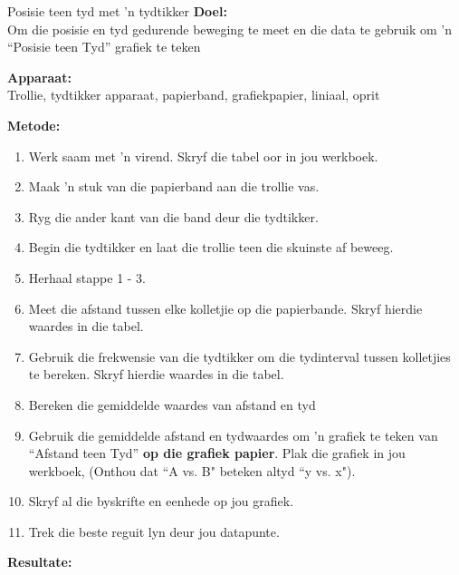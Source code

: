 \begin{f_experiment}{Posisie teen tyd met 'n tydtikker}
            \nopagebreak
\textbf{Doel:}\\
Om die posisie en tyd gedurende beweging te meet en die data te gebruik om 'n ``Posisie teen Tyd'' grafiek te teken \par

\textbf{Apparaat:}\\
Trollie, tydtikker apparaat, papierband, grafiekpapier, liniaal, oprit \par
\textbf{Metode:}
\begin{enumerate}[noitemsep, label=\textbf{\arabic*}. ] 
    \item Werk saam met 'n virend. Skryf die tabel oor in jou werkboek.
    \item Maak 'n stuk van die papierband aan die trollie vas.
    \item Ryg die ander kant van die band deur die tydtikker.
    \item Begin die tydtikker en laat die trollie teen die skuinste af beweeg.
    \item Herhaal stappe 1 - 3.
    \item Meet die afstand tussen elke kolletjie op die papierbande. Skryf hierdie waardes in die tabel.
    \item Gebruik die frekwensie van die tydtikker om die tydinterval tussen kolletjies te bereken. Skryf hierdie waardes in die tabel. 
    \item Bereken die gemiddelde waardes van afstand en tyd
    \item Gebruik die gemiddelde afstand en tydwaardes om 'n grafiek te teken van ``Afstand teen Tyd'' \textbf{op die grafiek papier}. Plak die grafiek in jou werkboek, (Onthou dat ``A vs. B" beteken altyd ``y vs. x").
    \item Skryf al die byskrifte en eenhede op jou grafiek.
    \item Trek die beste reguit lyn deur jou datapunte.
\end{enumerate}
        \par 
        \label{m38795*id7141045}
          \textbf{Resultate:}\\
        \par 
          \begin{table}[H]
        \begin{center}

\end{center}
\end{table}
\end{f_experiment}
